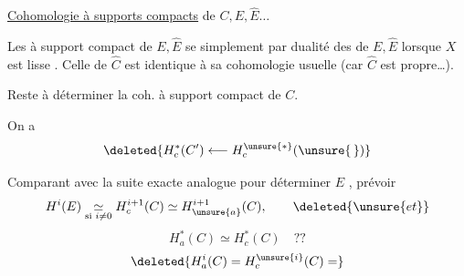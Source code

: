 \uline{Cohomologie à supports compacts}  de $C,E,\widehat E\ldots$

Les  à support compact de $E,\widehat E$ se  simplement par dualité des  de $E,\widehat E$ lorsque $X$ est lisse \unsure{\ldots\ (\ldots}. Celle de $\widehat C$ est identique à sa cohomologie usuelle (car $\widehat C$ est propre\ldots).

Reste à déterminer la coh. à support compact de $C$.

On a
\[
\deleted{H_c^*(C')\longleftarrow H_c^{\unsure{*}}(\unsure{\,})}
\]

Comparant avec la suite exacte analogue pour déterminer  $E$ ,  prévoir
\[
H^i(E)\underset{\text{si }i\neq0}{\simeq}H_c^{i+1}(C)
\simeq H_{\unsure{a}}^{i+1}(C),
\qquad \deleted{\unsure{et}}
\]
\[
\boxed{H_a^*(C)\simeq H_c^*(C)\quad ??}
\]
\[
\deleted{H_a^i(C)=H_c^{\unsure{i}}(C)=}
\]
